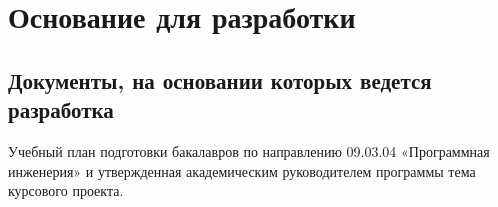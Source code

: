 \section{Основание для разработки}

\subsection{Документы, на основании которых ведется разработка}

Учебный план подготовки бакалавров по направлению 09.03.04 «Программная инженерия» и утвержденная академическим руководителем программы тема курсового проекта.
